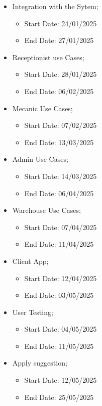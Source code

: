 \begin{itemize}
  \item Integration with the Sytem;
  \begin{itemize}
      \item Start Date: 24/01/2025 
      \item End Date: 27/01/2025 
  \end{itemize}
    \item Receptionist use Cases;
    \begin{itemize}
        \item Start Date: 28/01/2025 
        \item End Date: 06/02/2025 
    \end{itemize}
    \item Mecanic Use Cases;
    \begin{itemize}
      \item Start Date: 07/02/2025 
      \item End Date: 13/03/2025 
  \end{itemize}
    \item Admin Use Cases;
    \begin{itemize}
      \item Start Date: 14/03/2025 
      \item End Date: 06/04/2025 
  \end{itemize}
    \item Warehouse Use Cases;
    \begin{itemize}
      \item Start Date: 07/04/2025 
      \item End Date: 11/04/2025 
  \end{itemize}
    \item Client App;
    \begin{itemize}
      \item Start Date: 12/04/2025 
      \item End Date: 03/05/2025 
  \end{itemize}
  \item User Testing;
  \begin{itemize}
    \item Start Date: 04/05/2025 
    \item End Date: 11/05/2025 
\end{itemize}
  \item Apply suggestion;
  \begin{itemize}
    \item Start Date: 12/05/2025  
    \item End Date: 25/05/2025 
\end{itemize} 
  \end{itemize}

